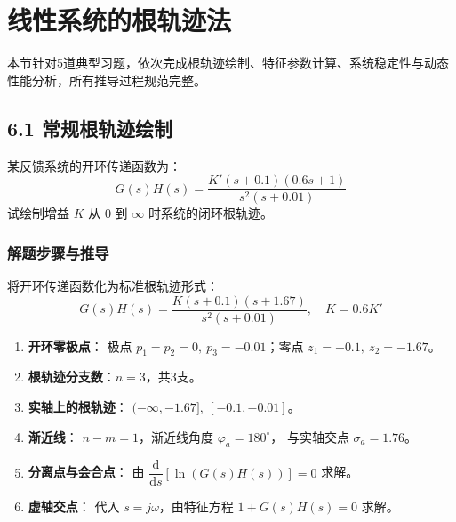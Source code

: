 \section{线性系统的根轨迹法}
本节针对5道典型习题，依次完成根轨迹绘制、特征参数计算、系统稳定性与动态性能分析，所有推导过程规范完整。

\subsection{6.1 常规根轨迹绘制}
某反馈系统的开环传递函数为：
\[
G(s)H(s)=\frac{K'(s+0.1)(0.6s+1)}{s^2(s+0.01)}
\]
试绘制增益 $K$ 从 $0$ 到 $\infty$ 时系统的闭环根轨迹。

\subsubsection{解题步骤与推导}
将开环传递函数化为标准根轨迹形式：
\[
G(s)H(s) = \frac{K(s+0.1)(s+1.67)}{s^2(s+0.01)},\quad K=0.6K'
\]

\begin{enumerate}
    \item \textbf{开环零极点}：
    极点 $p_1=p_2=0,\ p_3=-0.01$；零点 $z_1=-0.1,\ z_2=-1.67$。

    \item \textbf{根轨迹分支数}：$n=3$，共3支。

    \item \textbf{实轴上的根轨迹}：
    $(-\infty,-1.67],\ [-0.1,-0.01]$。

    \item \textbf{渐近线}：
    $n-m=1$，渐近线角度 $\varphi_a=180^\circ$，
    与实轴交点 $\sigma_a=1.76$。

    \item \textbf{分离点与会合点}：
    由 $\dfrac{\mathrm{d}}{\mathrm{d}s}\left[\ln(G(s)H(s))\right] = 0$ 求解。

    \item \textbf{虚轴交点}：
    代入 $s=j\omega$，由特征方程 $1+G(s)H(s)=0$ 求解。
\end{enumerate}

